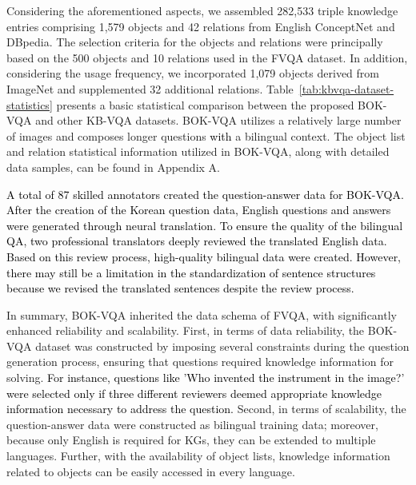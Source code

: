 \documentclass[letterpaper]{article} %
\newcommand{\kt}[1]{\textcolor{black}{#1}}
\begin{document}
Considering the aforementioned aspects, we assembled 282,533 triple knowledge entries comprising 1,579 objects and 42 relations from English ConceptNet and DBpedia. The selection criteria for the objects and relations were principally based on the 500 objects and 10 relations used in the FVQA dataset. In addition, considering the usage frequency, we incorporated 1,079 objects derived from ImageNet \cite{imagenet} and supplemented 32 additional relations. Table~\ref{tab:kbvqa-dataset-statistics} presents a basic statistical comparison between the proposed BOK-VQA and other KB-VQA datasets. BOK-VQA utilizes a relatively large number of images and composes longer questions \kt{with} a bilingual context. The object list and relation statistical information utilized in BOK-VQA, along with detailed data samples, can be found in Appendix A.

\kt{A total of 87 skilled annotators created the question-answer data for BOK-VQA. After the creation of the Korean question data, English questions and answers were generated through neural translation. To ensure the quality of the bilingual QA, two professional translators deeply reviewed the translated English data. Based on this review process, high-quality bilingual data were created. However, there may still be a limitation in the standardization of sentence structures because we revised the translated sentences despite the review process. }

In summary, BOK-VQA inherited the data schema of FVQA, with significantly enhanced reliability and scalability. First, in terms of data reliability, the BOK-VQA dataset was constructed by imposing several constraints during the question generation process, ensuring that questions required knowledge information for solving. \kt{For instance, questions like 'Who invented the instrument in the image?' were selected only if three different reviewers deemed appropriate knowledge information necessary to address the question.} Second, in terms of scalability, the question-answer data were constructed as bilingual training data; moreover, because only English is required for KGs, they can be extended to multiple languages. Further, with the availability of object lists, knowledge information related to objects can be easily accessed in every language.
\end{document}
